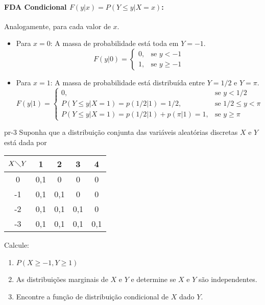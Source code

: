 \documentclass[
]{article}
\begin{document}
\paragraph{FDA Condicional $F(y|x) = P(Y \le y | X=x)$:}

Analogamente, para cada valor de \(x\).

\begin{itemize}
    \item Para $x=0$: A massa de probabilidade está toda em $Y=-1$.
    $$ F(y|0) = 
    \begin{cases}
        0, & \text{se } y < -1 \\
        1, & \text{se } y \ge -1
    \end{cases}
    $$
    \item Para $x=1$: A massa de probabilidade está distribuída entre $Y=1/2$ e $Y=\pi$.
    $$ F(y|1) = 
    \begin{cases}
        0, & \text{se } y < 1/2 \\
        P(Y \le y | X=1) = p(1/2|1) = 1/2, & \text{se } 1/2 \le y < \pi \\
        P(Y \le y | X=1) = p(1/2|1) + p(\pi|1) = 1, & \text{se } y \ge \pi
    \end{cases}
    $$
\end{itemize}

\newpage

\begin{problema}{}{pr-3}
Suponha que a distribuição conjunta das variáveis aleatórias discretas $X$ e $Y$ está dada por
\begin{center}
    \begin{tabular}{|c|c|c|c|c|} \hline
        $X \diagdown Y$ & 1 & 2 & 3 & 4 \\ \hline
        0 & 0,1 & 0 & 0 & 0 \\ \hline
        -1 & 0,1 & 0,1 & 0 & 0 \\ \hline
        -2 & 0,1 & 0,1 & 0,1 & 0 \\ \hline
        -3 & 0,1 & 0,1 & 0,1 & 0,1 \\ \hline
    \end{tabular}
\end{center}
Calcule:
\begin{enumerate}
    \item $ P(X \geq -1, Y \geq 1) $
    \item As distribuições marginais de $X$ e $Y$ e determine se $X$ e $Y$ são independentes.
    \item Encontre a função de distribuição condicional de $X$ dado $Y.$
\end{enumerate}
\end{problema}
\end{document}
